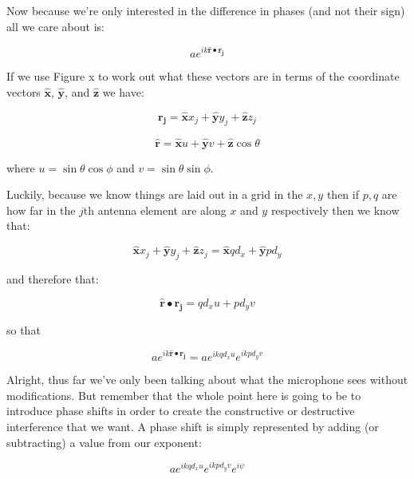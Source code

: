\documentclass[10pt,a4paper]{article}
\begin{document}
Now because we're only interested in the difference in phases (and not their sign) all we care about is:

\begin{equation}
ae^{ik\mathbf{\hat{r}}\bullet\mathbf{r_j}}
\end{equation}

If we use Figure x to work out what these vectors are in terms of the coordinate vectors $\mathbf{\hat{x}}$, $\mathbf{\hat{y}}$, and $\mathbf{\hat{z}}$ we have:

\begin{equation}
\mathbf{r_j} = \mathbf{\hat{x}}x_j + \mathbf{\hat{y}}y_j + \mathbf{\hat{z}}z_j
\end{equation}

\begin{equation}
\mathbf{\hat{r}} = \mathbf{\hat{x}}u + \mathbf{\hat{y}}v + \mathbf{\hat{z}}\cos \theta
\end{equation}

where $u=\sin \theta \cos \phi$ and $v=\sin \theta \sin \phi$.

Luckily, because we know things are laid out in a grid in the $x,y$ then if $p,q$ are how far in the $j$th antenna element are along $x$ and $y$ respectively then we know that:

\begin{equation}
 \mathbf{\hat{x}}x_j + \mathbf{\hat{y}}y_j + \mathbf{\hat{z}}z_j =  \mathbf{\hat{x}}qd_x + \mathbf{\hat{y}}pd_y
\end{equation}

and therefore that:

\begin{equation}
\mathbf{\hat{r}}\bullet\mathbf{r_j}=qd_xu+pd_yv
\end{equation}

so that

\begin{equation}
ae^{ik\mathbf{\hat{r}}\bullet\mathbf{r_j}}=ae^{ikqd_xu}e^{ikpd_yv}
\end{equation}

Alright, thus far we've only been talking about what the microphone sees without modifications. But remember that the whole point here is going to be to introduce phase shifts in order to create the constructive or destructive interference that we want. A phase shift is simply represented by adding (or subtracting) a value from our exponent:

\begin{equation}
ae^{ikqd_xu}e^{ikpd_yv}e^{i\psi}
\end{equation}
\end{document}

